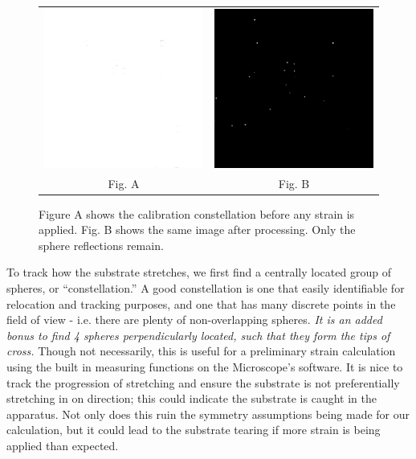 \begin{figure}[h!]
	\begin{tabular}{cc}
		\includegraphics[width= .48\linewidth]{Chapters/Figures/1xzoom_constellation_zeroStrain.png} & \includegraphics[width= .48\linewidth]{Chapters/Figures/1xzoom_constellation_zeroStrain_supercontrast.png}\\
		Fig. A & Fig. B
	\end{tabular}
	\caption[Bright-field pre and post image processing]{Figure A shows the calibration constellation before any strain is applied. Fig. B shows the same image after processing. Only the sphere reflections remain.}
		\label{fig:TDpreandpost}
\end{figure}

To track how the substrate stretches, we first find a centrally located group of spheres, or ``constellation.'' A good constellation is one that easily identifiable for relocation and tracking purposes, and one that has many discrete points in the field of view - i.e. there are plenty of non-overlapping spheres. \emph{It is an added bonus to find 4 spheres perpendicularly located, such that they form the tips of cross.} Though not necessarily, this is useful for a preliminary strain calculation using the built in measuring functions on the Microscope's software. It is nice to track the progression of stretching and ensure the substrate is not preferentially stretching in on direction; this could indicate the substrate is caught in the apparatus. Not only does this ruin the symmetry assumptions being made for our calculation, but it could lead to the substrate tearing if more strain is being applied than expected.

